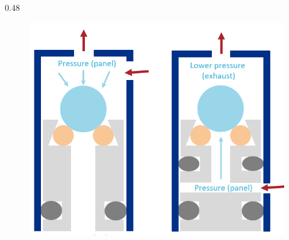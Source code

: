 \documentclass{beamer}
\begin{document}
\begin{frame}
\begin{columns}
\begin{column}{0.48\framewidth}
\begin{figure}[!h]
\centering
\includegraphics[width =\columnwidth]{figures/png/gassystem.png}
\label{fig:gassystem}
\end{figure}
        \end{column}
    \end{columns}
  
\end{frame}
\end{document}
